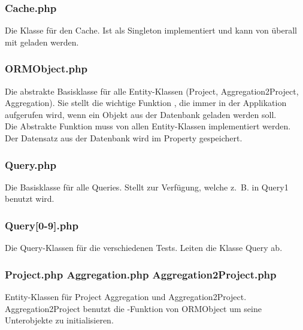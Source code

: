 \subsubsection{Cache.php}
Die Klasse für den Cache. Ist als Singleton implementiert und kann von überall mit  geladen werden.

\subsubsection{ORMObject.php}
Die abstrakte Basisklasse für alle Entity-Klassen (Project, Aggregation2Project, Aggregation). Sie stellt die wichtige Funktion , die immer in der Applikation aufgerufen wird, wenn ein Objekt aus der Datenbank geladen werden soll. \\
Die Abstrakte Funktion  muss von allen Entity-Klassen implementiert werden. Der Datensatz aus der Datenbank wird im Property  gespeichert.

\subsubsection{Query.php}
Die Basisklasse für alle Queries. Stellt  zur Verfügung, welche z.~B. in Query1 benutzt wird.

\subsubsection{Query[0-9].php}
Die Query-Klassen für die verschiedenen Tests. Leiten die Klasse Query ab.

\subsubsection{Project.php Aggregation.php Aggregation2Project.php}
Entity-Klassen für Project Aggregation und Aggregation2Project. Aggregation2Project benutzt die -Funktion von ORMObject um seine Unterobjekte zu initialisieren.







